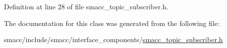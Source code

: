 Definition at line 28 of file smacc\+\_\+topic\+\_\+subscriber.\+h.



The documentation for this class was generated from the following file\+:\begin{DoxyCompactItemize}
\item 
smacc/include/smacc/interface\+\_\+components/\hyperlink{smacc__topic__subscriber_8h}{smacc\+\_\+topic\+\_\+subscriber.\+h}\end{DoxyCompactItemize}
